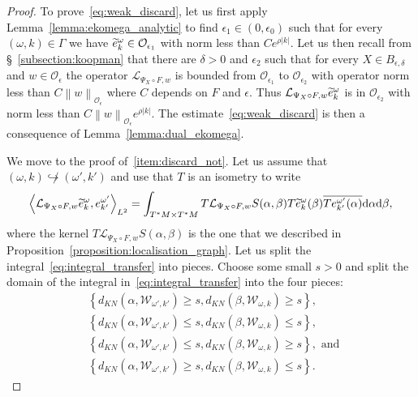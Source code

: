 \documentclass[10pt]{amsart}
\theoremstyle{definition}\newtheorem{defi}[theo]{Definition}\newtheorem{rema}[theo]{Remark}\newtheorem{exam}[theo]{Example}\newtheorem{exem}[theo]{Example}\newtheorem{nota}[theo]{Notation}
\newcommand{\set}[1]{\left\{ #1 \right\}}
\newcommand{\n}[1]{\left\|#1\right\|}
\newcommand{\va}[1]{\left|#1\right|}
\newcommand{\clO}{\mathcal{O}}
\newcommand{\clL}{\mathcal{L}}
\newcommand{\clW}{\mathcal{W}}
\newcommand{\rmd}{\mathrm{d}}
\let\oldtilde\tilde
\renewcommand*{\tilde}[1]{\mathchoice{\widetilde{#1}}{\widetilde{#1}}{\oldtilde{#1}}{\oldtilde{#1}}}
\begin{document}
\begin{proof}
To prove~\eqref{eq:weak_discard}, let us first apply Lemma~\ref{lemma:ekomega_analytic} to find $\epsilon_1 \in (0,\epsilon_0)$ such that for every $(\omega,k) \in \Gamma$ we have $\tilde{e}_{k}^{\omega} \in \clO_{\epsilon_1}$ with norm less than $C e^{\rho \va{k}}$. Let us then recall from \S~\ref{subsection:koopman} that there are $\delta > 0$ and $\epsilon_2$ such that for every $X \in B_{\epsilon,\delta}$ and $w \in \clO_\epsilon$ the operator $\clL_{\Psi_X \circ F,w}$ is bounded from $\clO_{\epsilon_1}$ to $\clO_{\epsilon_2}$ with operator norm less than $C \n{w}_{\clO_\epsilon}$ where $C$ depends on $F$ and $\epsilon$. Thus $\clL_{\Psi_X \circ F,w} \tilde{e}_{k}^{\omega}$ is in $\clO_{\epsilon_2}$ with norm less than $C \n{w}_{\clO_\epsilon} e^{\rho \va{k}}$. The estimate~\eqref{eq:weak_discard} is then a consequence of Lemma~\ref{lemma:dual_ekomega}.

We move to the proof of~\eqref{item:discard_not}. Let us assume that $(\omega,k) \not\hookrightarrow (\omega',k')$ and use that $T$ is an isometry to write
\begin{equation}\label{eq:integral_transfer}
\left\langle \clL_{\Psi_X \circ F,w} \tilde{e}_{k}^{\omega}, e_{k'}^{\omega'} \right\rangle_{L^2} = \int_{T^* M \times T^* M} T \clL_{\Psi_X \circ F,w} S(\alpha,\beta) T \tilde{e}_{k}^{\omega} (\beta) \overline{ T e_{k'}^{\omega'}(\alpha)} \rmd \alpha \rmd \beta,
\end{equation}
where the kernel $T \clL_{\Psi_X \circ F,w}S(\alpha,\beta)$ is the one that we described in Proposition~\ref{proposition:localisation_graph}. Let us split the integral~\eqref{eq:integral_transfer} into pieces. Choose some small $s > 0$ and split the domain of the integral in~\eqref{eq:integral_transfer} into the four pieces:
\begin{equation}\label{eq:integral_transfer_split}
\begin{split}
&\set{d_{KN}(\alpha, \clW_{\omega',k'}) \geq s, d_{KN}(\beta,\clW_{\omega,k})\geq s}, \\
& \set{d_{KN}(\alpha, \clW_{\omega',k'}) \leq s, d_{KN}(\beta,\clW_{\omega,k})\leq s}, \\
& \set{d_{KN}(\alpha, \clW_{\omega',k'}) \leq s, d_{KN}(\beta,\clW_{\omega,k})\geq s}, \text{ and }\\ & \set{d_{KN}(\alpha, \clW_{\omega',k'}) \geq s, d_{KN}(\beta,\clW_{\omega,k})\leq s}.
\end{split}
\end{equation}


\end{proof}
\end{document}
